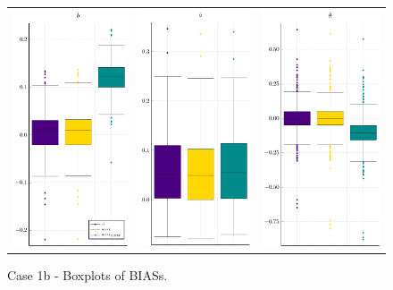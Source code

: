\begin{figure}[H] 
	\centering \begin{tabular}[b]{c c c}
		\includegraphics[width=.3\textwidth]{Figures/1b/BIAS_b.pdf} & \includegraphics[width=.3\textwidth]{Figures/1b/BIAS_a.pdf} & \includegraphics[width=.3\textwidth]{Figures/1b/BIAS_t.pdf}
	\end{tabular}
	\caption{Case 1b - Boxplots of BIASs.}
	\label{fig:bpBIAS1b}
\end{figure}
